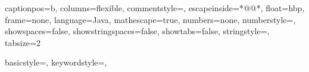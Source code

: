 \newcommand{\MYPARAGRAPH}[1]{\paragraph{\textnormal{\textbf{#1}}}}



\newcommand{\CODESIZE}{\small}
\newcommand{\CODESTYLE}{\ttfamily}

\lstset%
{%
	captionpos=b,
	columns=flexible, %
	commentstyle=\CODESTYLE\footnotesize\color{purple},
	escapeinside={*@}{@*},
	float=hbp,
	frame=none,
	language=Java,
	mathescape=true,
	numbers=none, %
	numberstyle=\tiny,
	showspaces=false,
	showstringspaces=false,
	showtabs=false,
	stringstyle=\color{teal},
	tabsize=2%
}

\newcommand{\CODE}[1]{\texttt{\CODESIZE#1}} %
\newcommand{\GREYCODE}[1]{\CODE{
	\color{black}{#1}}} %
\newcommand{\SJCODE}[1]
{%
	\lstinline[style=SJ]+#1+%
}

{%
	\onehalfspacing
	\lstset%
	{%
		basicstyle=\CODESTYLE\footnotesize,
		keywordstyle=\CODESTYLE\footnotesize,
	}
}%
{%
	\doublespacing %
}

